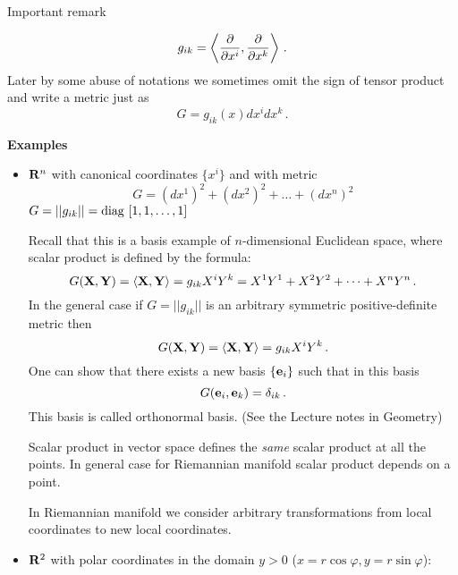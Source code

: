 \documentclass[12pt]{article}
\theoremstyle{theorem}
\numberwithin{equation}{section}
\begin{document}
Important remark

     \begin{equation}\label{imporatantremark2}
 g_{ik}=\left\langle{{\partial\over \partial x^i},{\partial\over \partial x^k}}\right\rangle\,.
     \end{equation}
Later by some abuse of notations we sometimes omit the sign of tensor product
and write a metric just as
\begin{equation*}\label{symb1}
    G=g_{ik}(x)dx^idx^k\,.
\end{equation*}


{\bf Examples}

   \begin{itemize}
\item


   ${\bf R}^n$ with canonical coordinates $\{x^i\}$ and with metric
               $$
           G=(dx^1)^2+(dx^2)^2+\dots+(dx^n)^2
               $$
           $G=||g_{ik}||=\rm diag\,\, [1,1,\dots,1]$

Recall that this is a basis example of $n$-dimensional Euclidean space, where scalar product
is defined by the formula:
              $$
     G({\bf X},{\bf Y})=\langle{\bf X},{\bf Y}\rangle=g_{ik}X^iY^k=X^1Y^1+X^2Y^2+\dots+X^nY^n\,.
              $$
In the general case if $G=||g_{ik}||$ is an
arbitrary symmetric positive-definite metric then
                $$
            G({\bf X},{\bf Y})=\langle{\bf X},{\bf Y}\rangle=g_{ik}X^iY^k\,.
                $$
One can show that there exists a new basis $\{{\bf e}_i\}$ such that in this basis
              $$
              G({\bf e}_i,{\bf e}_k)=\delta_{ik}\,.
               $$
This basis is called orthonormal basis. (See the Lecture notes in Geometry)



Scalar product in vector space defines the {\it same}
scalar product at all the points. In general case
for Riemannian manifold scalar product depends on a point.

In Riemannian manifold we consider arbitrary transformations from
local coordinates to new local coordinates.


\item  ${\bf R}^2$ with polar coordinates in the domain $y>0$
($x=r\cos\varphi, y=r\sin\varphi$):


\end{itemize}
\end{document}

